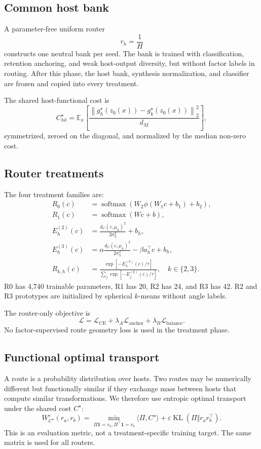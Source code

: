 \documentclass[11pt,a4paper]{article}
\newcommand{\E}{\mathbb{E}}
\newcommand{\loss}{\mathcal{L}}
\newcommand{\norm}[1]{\left\lVert #1 \right\rVert}
\newcommand{\softmax}{\operatorname{softmax}}
\newcommand{\KL}{\operatorname{KL}}
\begin{document}
\subsection{Common host bank}
A parameter-free uniform router
\begin{equation}
 r_h=\frac{1}{H}
\end{equation}
constructs one neutral bank per seed. The bank is trained with classification, retention anchoring, and weak host-output diversity, but without factor labels in routing. After this phase, the host bank, synthesis normalization, and classifier are frozen and copied into every treatment.

The shared host-functional cost is
\begin{equation}
 C^\star_{hk}=\E_x\left[\frac{\norm{g_h^\star(z_0(x))-g_k^\star(z_0(x))}_2^2}{d_M}\right],
\end{equation}
symmetrized, zeroed on the diagonal, and normalized by the median non-zero cost.

\subsection{Router treatments}
The four treatment families are:
\begin{align}
R_0(c)&=\softmax\!\left(W_2\phi(W_1c+b_1)+b_2\right),\\
R_1(c)&=\softmax(Wc+b),\\
E^{(2)}_h(c)&=\frac{d_C(c,\mu_h)^2}{2\sigma_h^2}+b_h,\\
E^{(3)}_h(c)&=\alpha\frac{d_C(c,\mu_h)^2}{2\sigma_h^2}-\beta a_h^\top c+b_h,\\
R_{k,h}(c)&=\frac{\exp[-E^{(k)}_h(c)/\tau]}{\sum_j\exp[-E^{(k)}_j(c)/\tau]},\quad k\in\{2,3\}.
\end{align}
R0 has 4,740 trainable parameters, R1 has 20, R2 has 24, and R3 has 42. R2 and R3 prototypes are initialized by spherical $k$-means without angle labels.

The router-only objective is
\begin{equation}
 \loss=\loss_{\mathrm{CE}}+\lambda_A\loss_{\mathrm{anchor}}+\lambda_B\loss_{\mathrm{balance}}.
\end{equation}
No factor-supervised route geometry loss is used in the treatment phase.

\subsection{Functional optimal transport}
A route is a probability distribution over hosts. Two routes may be numerically different but functionally similar if they exchange mass between hosts that compute similar transformations. We therefore use entropic optimal transport under the shared cost $C^\star$:
\begin{equation}
 W_{C^\star}^{\varepsilon}(r_a,r_b)=
 \min_{\Pi\mathbf 1=r_a,\Pi^\top\mathbf 1=r_b}
 \langle \Pi,C^\star\rangle
 +\varepsilon\KL(\Pi\Vert r_ar_b^\top).
\end{equation}
This is an evaluation metric, not a treatment-specific training target. The same matrix is used for all routers.
\end{document}
